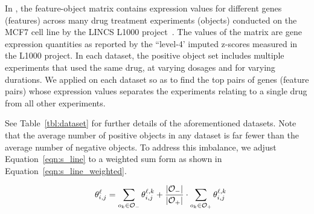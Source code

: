 In \lincs, the feature-object matrix 
contains expression values for different genes 
(features) across many drug treatment experiments 
(objects) conducted on the MCF7 cell line by the LINCS L1000 project~\cite{subramanian2017next}. 
The values of the matrix are gene expression quantities as reported by the ``level-4' imputed z-scores measured in the L1000 project. 
In each dataset, the positive object set includes 
multiple experiments that used the same drug, at varying dosages and for varying durations. We applied \genviz on each dataset 
so as to find the top pairs of genes (feature pairs) 
whose expression values separates the \lincs experiments 
relating to a single drug from all other \lincs experiments.

See Table~\ref{tbl:dataset} for further details 
of the aforementioned datasets. 
Note that the average number of positive objects 
in any dataset is far fewer than the average number 
of negative objects. To address this imbalance, 
we adjust Equation~\ref{eqn:s_line} 
to a weighted sum form as shown in Equation~\ref{eqn:s_line_weighted}.

 


\begin{equation}\label{eqn:s_line_weighted}
\hspace{3mm} \theta_{i,j}^{\ell}= \sum_{o_k\in{\oo_-}}{\theta_{i,j}^{\ell,k}}+\frac{|\oo_-|}{|\oo_+|}\cdot\sum_{o_k\in{\oo_+}}{\theta_{i,j}^{\ell,k}} %
\end{equation}



